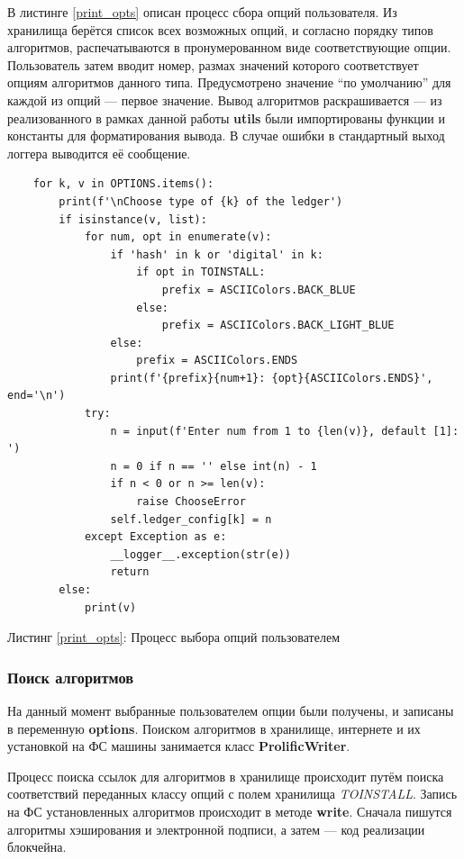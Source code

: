 В листинге \ref{print_opts} описан процесс сбора опций пользователя. Из
хранилища берётся список всех возможных опций, и согласно порядку типов
алгоритмов, распечатываются в пронумерованном виде соответствующие опции.
Пользователь затем вводит номер, размах значений которого соответствует опциям
алгоритмов данного типа. Предусмотрено значение ``по умолчанию'' для каждой из
опций --- первое значение. Вывод алгоритмов раскрашивается --- из
реализованного в рамках данной работы \textbf{utils} были импортированы функции
и константы для форматирования вывода. В случае ошибки в стандартный выход
логгера выводится её сообщение.
\begin{center}
\begin{lstlisting}
    for k, v in OPTIONS.items():
        print(f'\nChoose type of {k} of the ledger')
        if isinstance(v, list):
            for num, opt in enumerate(v):
                if 'hash' in k or 'digital' in k:
                    if opt in TOINSTALL:
                        prefix = ASCIIColors.BACK_BLUE
                    else:
                        prefix = ASCIIColors.BACK_LIGHT_BLUE
                else:
                    prefix = ASCIIColors.ENDS
                print(f'{prefix}{num+1}: {opt}{ASCIIColors.ENDS}', end='\n')
            try:
                n = input(f'Enter num from 1 to {len(v)}, default [1]: ')
                n = 0 if n == '' else int(n) - 1
                if n < 0 or n >= len(v):
                    raise ChooseError
                self.ledger_config[k] = n
            except Exception as e:
                __logger__.exception(str(e))
                return
        else:
            print(v)
\end{lstlisting}\label{print_opts}
    Листинг \ref{print_opts}: Процесс выбора опций пользователем
\end{center}

\subsubsection{Поиск алгоритмов}
На данный момент выбранные пользователем опции были получены, и записаны в переменную \textbf{options}.
Поиском алгоритмов в хранилище, интернете и их установкой на ФС машины занимается класс \textbf{ProlificWriter}.

Процесс поиска ссылок для алгоритмов в хранилище происходит путём поиска
соответствий переданных классу опций с полем хранилища \emph{TOINSTALL}. Запись
на ФС установленных алгоритмов происходит в методе \textbf{write}. Сначала
пишутся алгоритмы хэширования и электронной подписи, а затем --- код реализации
блокчейна.

